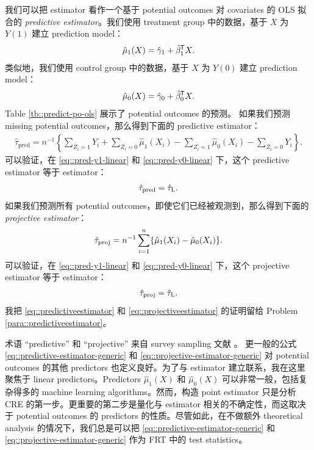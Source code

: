 我们可以把 \citet{lin2013} estimator 看作一个基于 potential outcomes 对 covariates 的 OLS 拟合的 {\it predictive estimator}。我们使用 treatment group 中的数据，基于 $X$ 为 $Y(1)$ 建立 prediction model：
\begin{eqnarray}
\label{eq::pred-y1-linear}
\hat{\mu}_1(X) = \hat{\gamma}_1 + \hat{\beta}_1^{\mkern-1.5mu\mathsf{T}} X.
\end{eqnarray}
类似地，我们使用 control group 中的数据，基于 $X$ 为 $Y(0)$ 建立 prediction model：
\begin{eqnarray}
\label{eq::pred-y0-linear}
\hat{\mu}_0(X)= \hat{\gamma}_0 + \hat{\beta}_0^{\mkern-1.5mu\mathsf{T}} X . 
\end{eqnarray}
Table \ref{tb::predict-po-ols} 展示了 potential outcomes 的预测。
如果我们预测 missing potential outcomes，那么得到下面的 predictive estimator：
\begin{eqnarray}\label{eq::predictive-estimator-generic}
\hat{\tau}_\text{pred} = n^{-1} \left\{   \sum_{Z_i=1}Y_i + \sum_{Z_i=0}\hat{\mu}_1(X_i) - \sum_{Z_i=1} \hat{\mu}_0(X_i) - \sum_{Z_i=0} Y_i     \right\} .
\end{eqnarray}
可以验证，在 \eqref{eq::pred-y1-linear} 和 \eqref{eq::pred-y0-linear} 下，这个 predictive estimator 等于 \citet{lin2013} estimator：
\begin{eqnarray}
\label{eq::predictiveestimator}
\hat{\tau}_\text{pred} = \hat{\tau}_\textsc{L}.
\end{eqnarray}
如果我们预测所有 potential outcomes，即使它们已经被观测到，那么得到下面的 {\it projective estimator}：
\begin{eqnarray}\label{eq::projective-estimator-generic}
\hat{\tau}_\text{proj} = n^{-1}  \sum_{i=1}^n \{ \hat{\mu}_1(X_i) - \hat{\mu}_0(X_i)    \}.
\end{eqnarray}
可以验证，在 \eqref{eq::pred-y1-linear} 和 \eqref{eq::pred-y0-linear} 下，这个 projective estimator 等于 \citet{lin2013} estimator：
\begin{eqnarray}
\label{eq::projectiveestimator}
\hat{\tau}_\text{proj} = \hat{\tau}_\textsc{L}.
\end{eqnarray}
我把 \eqref{eq::predictiveestimator} 和 \eqref{eq::projectiveestimator} 的证明留给 Problem \ref{para::predictiveestimator}。

术语 ``predictive'' 和 ``projective'' 来自 survey sampling 文献 \citep{firth1998robust, ding2018causal}。
更一般的公式 \eqref{eq::predictive-estimator-generic} 和 \eqref{eq::projective-estimator-generic} 对 potential outcomes 的其他 predictors 也定义良好。为了与 \citet{lin2013} estimator 建立联系，我在这里聚焦于 linear predictors。Predictors $\hat{\mu}_1(X)$ 和 $\hat{\mu}_0(X)$ 可以非常一般，包括复杂得多的 machine learning algorithms。然而，构造 point estimator 只是分析 CRE 的第一步。更重要的第二步是量化与 estimator 相关的不确定性，而这取决于 potential outcomes 的 predictors 的性质。尽管如此，在不做额外 theoretical analysis 的情况下，我们总是可以把 \eqref{eq::predictive-estimator-generic} 和 \eqref{eq::projective-estimator-generic} 作为 FRT 中的 test statistics。
 
